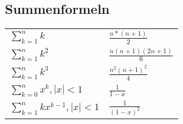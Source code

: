 \subsection{Summenformeln}
\begin{tabular}{ll}
    $ \sum_{k=1}^n k $ & $ \frac{n * (n+1)}{2} $ \\
    $ \sum_{k=1}^n k^2 $ & $ \frac{n(n + 1)(2n + 1)}{6} $ \\
    $ \sum_{k=1}^n k^3 $ & $ \frac{n^2(n+1)^2}{4} $ \\
    $ \sum_{k=0}^n x^k, |x| < 1 $ & $\frac{1}{1 -x} $ \\
    $ \sum_{k=1}^n kx^{k-1}, |x| < 1 $ & $ \frac{1}{(1-x)^2} $ \\
\end{tabular} 

